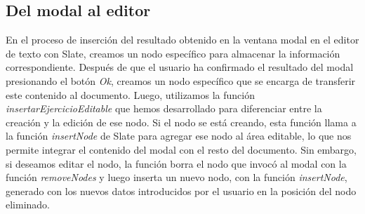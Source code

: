 \subsection{Del modal al editor}
En el proceso de inserción del resultado obtenido en la ventana modal en el editor de texto con Slate, creamos un nodo específico para almacenar la información correspondiente. Después de que el usuario ha confirmado el resultado del modal presionando el botón \textit{Ok}, creamos un nodo específico que se encarga de transferir este contenido al documento. Luego, utilizamos la función \textit{insertarEjercicioEditable} que hemos desarrollado para diferenciar entre la creación y la edición de ese nodo. Si el nodo se está creando, esta función llama a la función \textit{insertNode} de Slate para agregar ese nodo al área editable, lo que nos permite integrar el contenido del modal con el resto del documento. Sin embargo, si deseamos editar el nodo, la función borra el nodo que invocó al modal con la función \textit{removeNodes} y luego inserta un nuevo nodo, con la función \textit{insertNode}, generado con los nuevos datos introducidos por el usuario en la posición del nodo eliminado. 
